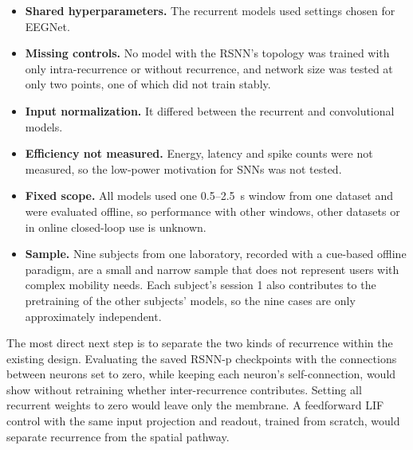 \documentclass[conference]{IEEEtran}
\begin{document}
\begin{itemize}
  \item \textbf{Shared hyperparameters.} The recurrent models used settings chosen for EEGNet.
  \item \textbf{Missing controls.} No model with the RSNN's topology was trained with only intra-recurrence or without recurrence, and network size was tested at only two points, one of which did not train stably.
  \item \textbf{Input normalization.} It differed between the recurrent and convolutional models.
  \item \textbf{Efficiency not measured.} Energy, latency and spike counts were not measured, so the low-power motivation for SNNs was not tested.
  \item \textbf{Fixed scope.} All models used one 0.5--2.5~s window from one dataset and were evaluated offline, so performance with other windows, other datasets or in online closed-loop use is unknown.
  \item \textbf{Sample.} Nine subjects from one laboratory, recorded with a cue-based offline paradigm, are a small and narrow sample that does not represent users with complex mobility needs. Each subject's session 1 also contributes to the pretraining of the other subjects' models, so the nine cases are only approximately independent.
\end{itemize}

The most direct next step is to separate the two kinds of recurrence within the existing design. Evaluating the saved RSNN-p checkpoints with the connections between neurons set to zero, while keeping each neuron's self-connection, would show without retraining whether inter-recurrence contributes. Setting all recurrent weights to zero would leave only the membrane. A feedforward LIF control with the same input projection and readout, trained from scratch, would separate recurrence from the spatial pathway.
\end{document}

